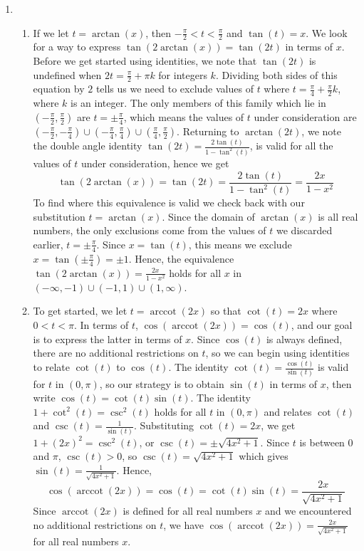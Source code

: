 {\begin{enumerate}
\item  

\begin{enumerate}

\item If we let $t = \arctan(x)$, then $-\frac{\pi}{2} < t < \frac{\pi}{2}$ and $\tan(t) = x$.   We look for a way to express $\tan(2 \arctan(x)) = \tan(2t)$ in terms of $x$.  Before we get started using identities, we note that $\tan(2t)$ is undefined when $2t = \frac{\pi}{2} + \pi k$ for integers $k$.  Dividing both sides of this equation by $2$ tells us we need to exclude values of $t$ where $t = \frac{\pi}{4} + \frac{\pi}{2} k$, where $k$ is an integer.  The only members of this family which lie in $\left(-\frac{\pi}{2}, \frac{\pi}{2}\right)$ are $t = \pm \frac{\pi}{4}$, which means the values of $t$ under consideration are $\left(-\frac{\pi}{2}, -\frac{\pi}{4}\right) \cup \left(-\frac{\pi}{4}, \frac{\pi}{4}\right) \cup \left(\frac{\pi}{4}, \frac{\pi}{2}\right)$.  Returning to $\arctan(2t)$, we note the double angle identity $\tan(2t) = \frac{2 \tan(t)}{1 - \tan^{2}(t)}$, is valid for all the values of $t$ under consideration, hence we get \[\tan(2 \arctan(x)) = \tan(2t) = \frac{2 \tan(t)}{1 - \tan^{2}(t)}= \frac{2x}{1-x^2}\]  To find where this equivalence is valid we check back with our substitution $t = \arctan(x)$. Since the domain of $\arctan(x)$ is all real numbers, the only exclusions come from the values of $t$ we discarded earlier, $t = \pm \frac{\pi}{4}$.   Since $x =\tan(t)$, this means we exclude $x = \tan\left(\pm \frac{\pi}{4}\right) = \pm 1$.  Hence, the equivalence  $\tan(2 \arctan(x)) =  \frac{2x}{1-x^2}$ holds for all $x$ in  $(-\infty, -1) \cup (-1,1) \cup (1,\infty)$.

\item  To get started, we let $t = \operatorname{arccot}(2x)$ so that  $\cot(t) = 2x$ where $0 < t < \pi$.  In terms of $t$, $\cos(\operatorname{arccot}(2x)) = \cos(t)$, and our goal is to express the latter in terms of $x$.   Since $\cos(t)$ is always defined, there are no additional restrictions on $t$, so we can begin using identities to relate $\cot(t)$ to $\cos(t)$.  The identity $\cot(t) = \frac{\cos(t)}{\sin(t)}$ is valid for $t$ in $(0,\pi)$, so our strategy is to obtain $\sin(t)$ in terms of $x$, then write $\cos(t) = \cot(t) \sin(t)$.   The identity $1 + \cot^{2}(t) = \csc^{2}(t)$ holds for all $t$ in $(0,\pi)$ and relates $\cot(t)$ and $\csc(t) = \frac{1}{\sin(t)}$.  Substituting $\cot(t) =2x$, we get  $1 + (2x)^2 = \csc^{2}(t)$, or $\csc(t) =  \pm \sqrt{4x^2+1}$. Since $t$ is between $0$ and $\pi$, $\csc(t) > 0$, so $\csc(t) =\sqrt{4x^2+1}$ which gives $\sin(t) = \frac{1}{\sqrt{4x^2+1}}$. Hence, \[\cos(\operatorname{arccot}(2x)) = \cos(t) = \cot(t) \sin(t) = \frac{2x}{\sqrt{4x^2+1}}\]   Since $\operatorname{arccot}(2x)$ is defined for all real numbers $x$ and we encountered no additional restrictions on $t$, we have  $\cos\left(\operatorname{arccot}(2x)\right) = \frac{2x}{\sqrt{4x^2+1}}$ for all real numbers $x$. 

\end{enumerate}

\end{enumerate}
}

